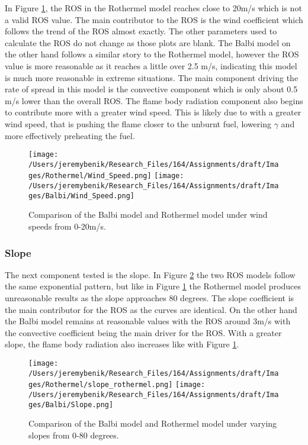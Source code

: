 \documentclass{article}
\begin{document}
\indent In Figure \ref{Wind Speed}, the ROS in the Rothermel model reaches close to 20m/s which is not a valid ROS value. The main contributor to the ROS is the wind coefficient which follows the trend of the ROS almost exactly. The other parameters used to calculate the ROS do not change as those plots are blank. The Balbi model on the other hand follows a similar story to the Rothermel model, however the ROS value is more reasonable as it reaches a little over 2.5 m/s, indicating this model is much more reasonable in extreme situations. The main component driving the rate of spread in this model is the convective component which is only about 0.5 m/s lower than the overall ROS. The flame body radiation component also begins to contribute more with a greater wind speed. This is likely due to with a greater wind speed, that is pushing the flame closer to the unburnt fuel, lowering $\gamma$ and more effectively preheating the fuel. 
\newpage
\begin{figure}[!h]
\centering
  \texttt{[image: /Users/jeremybenik/Research\_Files/164/Assignments/draft/Images/Rothermel/Wind\_Speed.png]}
  \texttt{[image: /Users/jeremybenik/Research\_Files/164/Assignments/draft/Images/Balbi/Wind\_Speed.png]}
  \caption{Comparison of the Balbi model and Rothermel model under wind speeds from 0-20m/s.}
  \label{Wind Speed}
\end{figure}
\subsubsection{Slope}

\indent The next component tested is the slope. In Figure \ref{Slope} the two ROS models follow the same exponential pattern, but like in Figure \ref{Wind Speed} the Rothermel model produces unreasonable results as the slope approaches 80 degrees. The slope coefficient is the main contributor for the ROS as the curves are identical. On the other hand the Balbi model remains at reasonable values with the ROS around 3m/s with the convective coefficient being the main driver for the ROS. With a greater slope, the flame body radiation also increases like with Figure \ref{Wind Speed}. 
\newpage
\begin{figure}[!h]
\centering
  \texttt{[image: /Users/jeremybenik/Research\_Files/164/Assignments/draft/Images/Rothermel/slope\_rothermel.png]}
  \texttt{[image: /Users/jeremybenik/Research\_Files/164/Assignments/draft/Images/Balbi/Slope.png]}
  \caption{Comparison of the Balbi model and Rothermel model under varying slopes from 0-80 degrees.}
  \label{Slope}
\end{figure}
\end{document}
